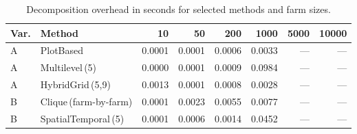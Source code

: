 \begin{table}[htbp]
\centering
\caption{Decomposition overhead in seconds for selected methods and farm sizes.}
\label{tab:decomp_overhead}
\begin{tabular}{llrrrrrr}
\toprule
    \textbf{Var.} & \textbf{Method} & \textbf{10} & \textbf{50} & \textbf{200} & \textbf{1000} & \textbf{5000} & \textbf{10000} \\ \midrule
    A & PlotBased & 0.0001 & 0.0001 & 0.0006 & 0.0033 & — & — \\
    A & Multilevel\,(5) & 0.0000 & 0.0001 & 0.0009 & 0.0984 & — & — \\
    A & HybridGrid\,(5,9) & 0.0013 & 0.0001 & 0.0008 & 0.0028 & — & — \\
    B & Clique\,(farm-by-farm) & 0.0001 & 0.0023 & 0.0055 & 0.0077 & — & — \\
    B & SpatialTemporal\,(5) & 0.0001 & 0.0006 & 0.0014 & 0.0452 & — & — \\
\bottomrule
\end{tabular}

    \smallskip{}
\end{table}
